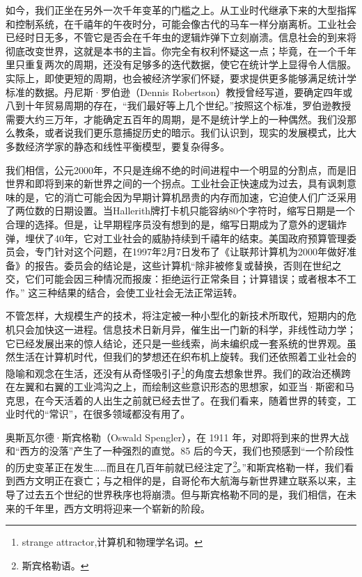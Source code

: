如今，我们正坐在另外一次千年变革的门槛之上。从工业时代继承下来的大型指挥和控制系统，在千禧年的午夜时分，可能会像古代的马车一样分崩离析。工业社会已经时日无多，不管它是否会在千年虫的逻辑炸弹下立刻崩溃。信息社会的到来将彻底改变世界，这就是本书的主旨。你完全有权利怀疑这一点；毕竟，在一个千年里只重复两次的周期，还没有足够多的迭代数据，使它在统计学上显得令人信服。实际上，即使更短的周期，也会被经济学家们怀疑，要求提供更多能够满足统计学标准的数据。丹尼斯·罗伯逊（Dennis Robertson）教授曾经写道，要确定四年或八到十年贸易周期的存在，“我们最好等上几个世纪。”按照这个标准，罗伯逊教授需要大约三万年，才能确定五百年的周期，是不是统计学上的一种偶然。我们没那么教条，或者说我们更乐意捕捉历史的暗示。我们认识到，现实的发展模式，比大多数经济学家的静态和线性平衡模型，要复杂得多。


我们相信，公元2000年，不只是连绵不绝的时间进程中一个明显的分割点，而是旧世界和即将到来的新世界之间的一个拐点。工业社会正快速成为过去，具有讽刺意味的是，它的消亡可能会因为早期计算机昂贵的内存而加速，它迫使人们广泛采用了两位数的日期设置。当Hallerith牌打卡机只能容纳80个字符时，缩写日期是一个合理的选择。但是，让早期程序员没有想到的是，缩写日期成为了意外的逻辑炸弹，埋伏了40年，它对工业社会的威胁持续到千禧年的结束。美国政府预算管理委员会，专门针对这个问题，在1997年2月7日发布了《让联邦计算机为2000年做好准备》的报告。委员会的结论是，这些计算机“除非被修复或替换，否则在世纪之交，它们可能会因三种情况而报废：拒绝运行正常条目；计算错误；或者根本不工作。” 这三种结果的结合，会使工业社会无法正常运转。


不管怎样，大规模生产的技术，将注定被一种小型化的新技术所取代，短期内的危机只会加快这一进程。信息技术日新月异，催生出一门新的科学，非线性动力学；它已经发展出来的惊人结论，还只是一些线索，尚未编织成一套系统的世界观。虽然生活在计算机时代，但我们的梦想还在织布机上旋转。我们还依照着工业社会的隐喻和观念在生活，还没有从奇怪吸引子\footnote{strange attractor,计算机和物理学名词。}的角度去想象世界。我们的政治还横跨在左翼和右翼的工业鸿沟之上，而绘制这些意识形态的思想家，如亚当·斯密和马克思，在今天活着的人出生之前就已经去世了。在我们看来，随着世界的转变，工业时代的“常识”，在很多领域都没有用了。


奥斯瓦尔德·斯宾格勒（Oswald Spengler），在 1911 年，对即将到来的世界大战和“西方的没落”产生了一种强烈的直觉。85 后的今天，我们也预感到“一个阶段性的历史变革正在发生……而且在几百年前就已经注定了\footnote{斯宾格勒语。}。”和斯宾格勒一样，我们看到西方文明正在衰亡；与之相伴的是，自哥伦布大航海与新世界建立联系以来，主导了过去五个世纪的世界秩序也将崩溃。但与斯宾格勒不同的是，我们相信，在未来的千年里，西方文明将迎来一个崭新的阶段。